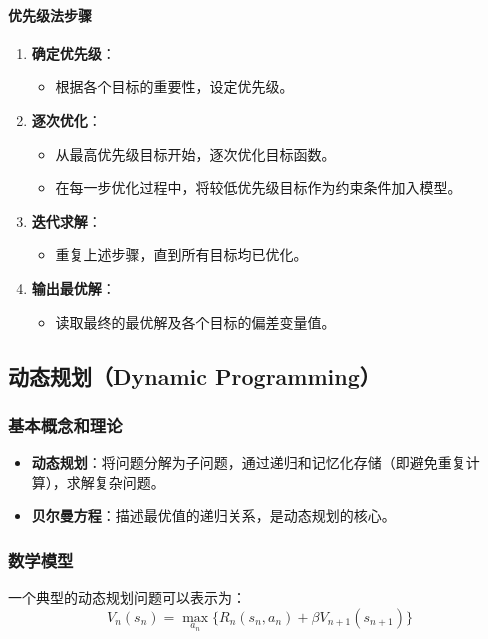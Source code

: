 \documentclass[UTF8]{ctexart}
\begin{document}
\paragraph{优先级法步骤}
\begin{enumerate}
    \item \textbf{确定优先级}：
        \begin{itemize}
            \item 根据各个目标的重要性，设定优先级。
        \end{itemize}
    \item \textbf{逐次优化}：
        \begin{itemize}
            \item 从最高优先级目标开始，逐次优化目标函数。
            \item 在每一步优化过程中，将较低优先级目标作为约束条件加入模型。
        \end{itemize}
    \item \textbf{迭代求解}：
        \begin{itemize}
            \item 重复上述步骤，直到所有目标均已优化。
        \end{itemize}
    \item \textbf{输出最优解}：
        \begin{itemize}
            \item 读取最终的最优解及各个目标的偏差变量值。
        \end{itemize}
\end{enumerate}

\subsection {动态规划（Dynamic Programming）}
\subsubsection {基本概念和理论}
\begin{itemize}
    \item \textbf{动态规划}：将问题分解为子问题，通过递归和记忆化存储（即避免重复计算），求解复杂问题。
    \item \textbf{贝尔曼方程}：描述最优值的递归关系，是动态规划的核心。
\end{itemize}

\subsubsection {数学模型}
一个典型的动态规划问题可以表示为：
\[
V_n(s_n) = \max_{a_n} \{ R_n(s_n, a_n) + \beta V_{n+1}(s_{n+1}) \}
\]
\end{document}
